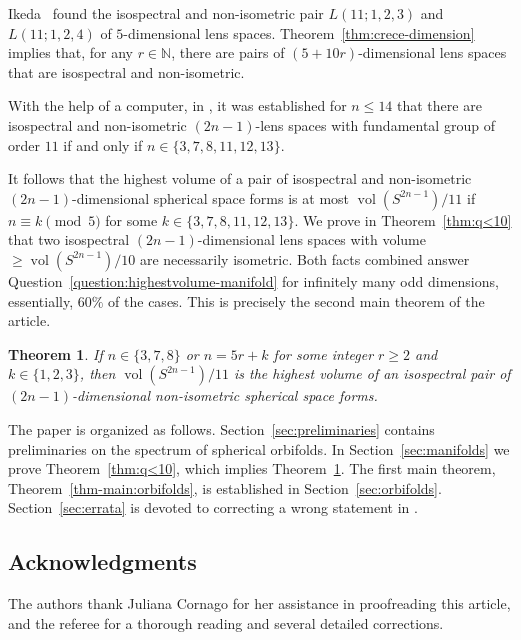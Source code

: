 \documentclass[12pt,a4paper,final]{amsart}
\theoremstyle{plain}
\newtheorem{theorem}{Theorem}[section]
\theoremstyle{definition}
\theoremstyle{remark}
\numberwithin{equation}{section}
\newcommand{\N}{\mathbb N}
\DeclareMathOperator{\vol}{vol}
\begin{document}
Ikeda~\cite{Ikeda80_3-dimI} found the isospectral and non-isometric pair $L(11;1,2,3)$ and $L(11;1,2,4)$ of $5$-dimensional lens spaces. 
Theorem~\ref{thm:crece-dimension} implies that, for any $r\in\N$, there are pairs of $(5+10r)$-dimensional lens spaces that are isospectral and non-isometric.

With the help of a computer, in \cite{LauretLinowitz}, it was established for $n\leq 14$ that there are isospectral and non-isometric $(2n-1)$-lens spaces with fundamental group of order $11$ if and only if $n\in\{3,7,8,11,12,13\}$. 

It follows that the highest volume of a pair of isospectral and non-isometric $(2n-1)$-dimensional spherical space forms is at most $\vol(S^{2n-1})/11$ if $n\equiv k\pmod{5}$ for some $k\in\{3,7,8,11,12,13\}$. 
We prove in Theorem~\ref{thm:q<10} that two isospectral $(2n-1)$-dimensional lens spaces with volume $\geq \vol(S^{2n-1})/10$ are necessarily isometric. 
Both facts combined answer Question~\ref{question:highestvolume-manifold} for infinitely many odd dimensions, essentially, $60\%$ of the cases. 
This is precisely the second main theorem of the article. 

\begin{theorem} \label{thm-main:manifolds}
If $n\in\{3,7,8\}$ or $n=5r+k$ for some integer $r\geq2$ and $k\in\{1,2,3\}$, then $\vol(S^{2n-1})/11$ is the highest volume of an isospectral pair of $(2n-1)$-dimensional non-isometric spherical space forms. 
\end{theorem}


The paper is organized as follows. 
Section~\ref{sec:preliminaries} contains preliminaries on the spectrum of spherical orbifolds. 
In Section~\ref{sec:manifolds} we prove Theorem~\ref{thm:q<10}, which implies Theorem~\ref{thm-main:manifolds}.
The first main theorem, Theorem~\ref{thm-main:orbifolds}, is established in Section~\ref{sec:orbifolds}. 
Section~\ref{sec:errata} is devoted to correcting a wrong statement in \cite{LauretLinowitz}. 
 






\subsection*{Acknowledgments}
The authors thank Juliana Cornago for her assistance in proofreading this article, and the referee for a 
thorough reading and several detailed corrections. 
\end{document}
